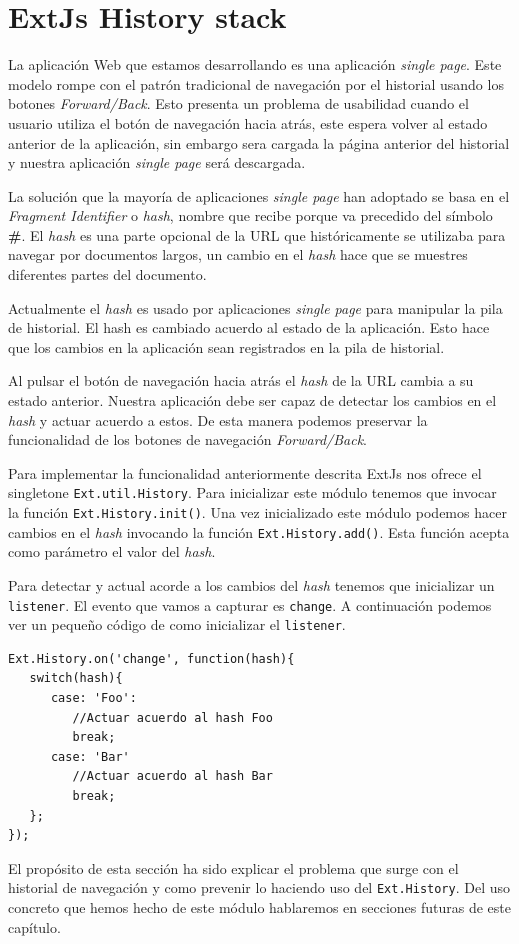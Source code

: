 \section{ExtJs History stack}
	La aplicación Web que estamos desarrollando es una aplicación \emph{single page}. Este modelo rompe con el patrón tradicional de navegación
	por el historial usando los botones \emph{Forward/Back}. Esto presenta un problema de usabilidad cuando el usuario utiliza el botón de
	navegación hacia atrás, este espera volver al estado anterior de la aplicación, sin embargo sera cargada la página anterior del historial y
	nuestra aplicación \emph{single page} será descargada.
	\par
	La solución que la mayoría de aplicaciones \emph{single page} han adoptado se basa en el \emph{Fragment Identifier}  o \emph{hash}, nombre que
	recibe porque va precedido del símbolo \textbf{\#}. El \emph{hash} es una parte opcional de la URL que históricamente se utilizaba para navegar
	por documentos largos, un cambio en el \emph{hash} hace que se muestres diferentes partes del documento.
	\par
	Actualmente el \emph{hash} es usado por aplicaciones \emph{single page} para manipular la pila de historial. El hash es cambiado acuerdo al
	estado de la aplicación. Esto hace que los cambios en la aplicación sean registrados en la pila de historial.
	\par
	Al pulsar el botón de navegación hacia atrás el \emph{hash} de la URL cambia a su estado anterior. Nuestra aplicación debe ser capaz de
	detectar los cambios en el \emph{hash} y actuar acuerdo a estos. De esta manera podemos preservar la funcionalidad de los botones de
	navegación \emph{Forward/Back}. 
	\par
	Para implementar la funcionalidad anteriormente descrita ExtJs nos ofrece el singletone \texttt{Ext.util.History}. Para inicializar este módulo
	tenemos que invocar la función \texttt{Ext.History.init()}. Una vez inicializado este módulo podemos hacer cambios en el \emph{hash} invocando
	la función \texttt{Ext.History.add()}. Esta función acepta como parámetro el valor del \emph{hash}. 
	\par
	Para detectar y actual acorde a los cambios del \emph{hash} tenemos que inicializar un \texttt{listener}. El evento que vamos a capturar es
	\texttt{change}. A continuación podemos ver un pequeño código de como inicializar el \texttt{listener}.
	\begin{lstlisting}
Ext.History.on('change', function(hash){
   switch(hash){
      case: 'Foo':
         //Actuar acuerdo al hash Foo
         break;
      case: 'Bar'
         //Actuar acuerdo al hash Bar
         break;
   };
});
	\end{lstlisting}
	\par
	El propósito de esta sección ha sido explicar el problema que surge con el historial de navegación y como prevenir lo haciendo uso del
	\texttt{Ext.History}. Del uso concreto que hemos hecho de este módulo hablaremos en secciones futuras de este capítulo.

